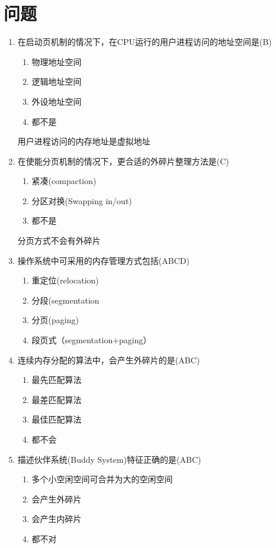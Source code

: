 \section{问题}
\begin{enumerate}
\item 在启动页机制的情况下，在CPU运行的用户进程访问的地址空间是(B)
\begin{enumerate}[A]
	\item 物理地址空间
	\item 逻辑地址空间
	\item 外设地址空间
	\item 都不是
\end{enumerate}
用户进程访问的内存地址是虚拟地址

\item 在使能分页机制的情况下，更合适的外碎片整理方法是(C)
\begin{enumerate}[A]
	\item 紧凑(compaction)
	\item 分区对换(Swapping in/out)
	\item 都不是
\end{enumerate}	
分页方式不会有外碎片

\item 操作系统中可采用的内存管理方式包括(ABCD)
\begin{enumerate}[A]
	\item 重定位(relocation)
	\item 分段(segmentation
	\item 分页(paging)
	\item 段页式（segmentation+paging）
	
\end{enumerate}	


\item 连续内存分配的算法中，会产生外碎片的是(ABC)
\begin{enumerate}[A]
	\item 最先匹配算法
	\item 最差匹配算法
	\item 最佳匹配算法
	\item 都不会
\end{enumerate}	


\item 描述伙伴系统(Buddy System)特征正确的是(ABC)
\begin{enumerate}[A]
	\item 多个小空闲空间可合并为大的空闲空间
	\item 会产生外碎片
	\item 会产生内碎片
	\item 都不对
\end{enumerate}	
\end{enumerate}